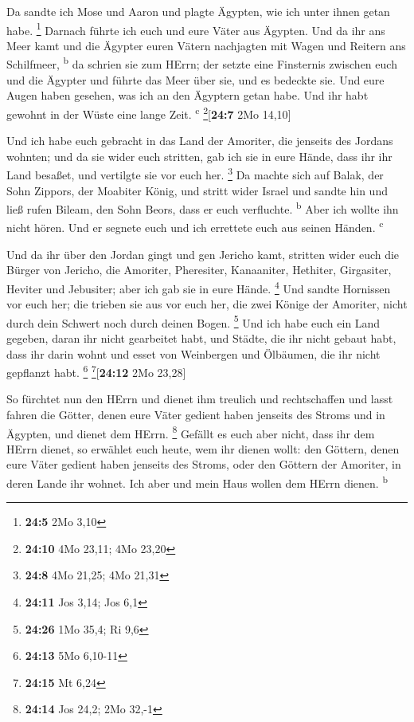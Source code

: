  Da sandte ich Mose und Aaron und plagte Ägypten, wie ich
unter ihnen getan habe. \footnote{\textbf{24:5} 2Mo 3,10} 
Darnach führte ich euch und eure Väter aus Ägypten. Und da ihr ans Meer
kamt und die Ägypter euren Vätern nachjagten mit Wagen und Reitern ans
Schilfmeer, \textsuperscript{b}  da schrien sie zum HErrn;
der setzte eine Finsternis zwischen euch und die Ägypter und führte das
Meer über sie, und es bedeckte sie. Und eure Augen haben gesehen, was
ich an den Ägyptern getan habe. Und ihr habt gewohnt in der Wüste eine
lange Zeit. \textsuperscript{c} \footnote{\textbf{24:10} 4Mo 23,11; 4Mo
  23,20}{[}\textbf{24:7} 2Mo 14,10{]}

 Und ich habe euch gebracht in das Land der Amoriter, die
jenseits des Jordans wohnten; und da sie wider euch stritten, gab ich
sie in eure Hände, dass ihr ihr Land besaßet, und vertilgte sie vor euch
her. \footnote{\textbf{24:8} 4Mo 21,25; 4Mo 21,31}  Da
machte sich auf Balak, der Sohn Zippors, der Moabiter König, und stritt
wider Israel und sandte hin und ließ rufen Bileam, den Sohn Beors, dass
er euch verfluchte. \textsuperscript{b}  Aber ich wollte
ihn nicht hören. Und er segnete euch und ich errettete euch aus seinen
Händen. \textsuperscript{c}

 Und da ihr über den Jordan gingt und gen Jericho kamt,
stritten wider euch die Bürger von Jericho, die Amoriter, Pheresiter,
Kanaaniter, Hethiter, Girgasiter, Heviter und Jebusiter; aber ich gab
sie in eure Hände. \footnote{\textbf{24:11} Jos 3,14; Jos 6,1}
 Und sandte Hornissen vor euch her; die trieben sie aus
vor euch her, die zwei Könige der Amoriter, nicht durch dein Schwert
noch durch deinen Bogen. \footnote{\textbf{24:26} 1Mo 35,4; Ri 9,6}
 Und ich habe euch ein Land gegeben, daran ihr nicht
gearbeitet habt, und Städte, die ihr nicht gebaut habt, dass ihr darin
wohnt und esset von Weinbergen und Ölbäumen, die ihr nicht gepflanzt
habt. \footnote{\textbf{24:13} 5Mo 6,10-11} \footnote{\textbf{24:15} Mt
  6,24}{[}\textbf{24:12} 2Mo 23,28{]}

 So fürchtet nun den HErrn und dienet ihm treulich und
rechtschaffen und lasst fahren die Götter, denen eure Väter gedient
haben jenseits des Stroms und in Ägypten, und dienet dem HErrn.
\footnote{\textbf{24:14} Jos 24,2; 2Mo 32,-1}  Gefällt es
euch aber nicht, dass ihr dem HErrn dienet, so erwählet euch heute, wem
ihr dienen wollt: den Göttern, denen eure Väter gedient haben jenseits
des Stroms, oder den Göttern der Amoriter, in deren Lande ihr wohnet.
Ich aber und mein Haus wollen dem HErrn dienen. \textsuperscript{b}

